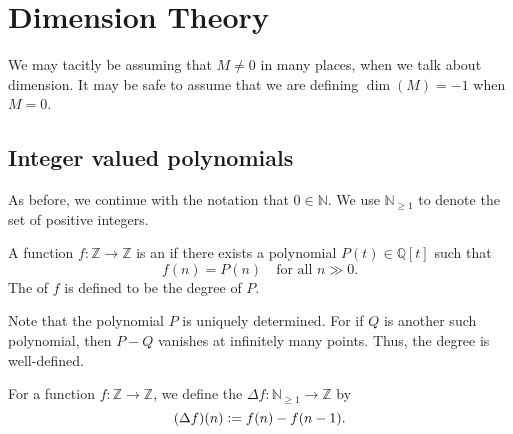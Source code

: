 \documentclass[12pt]{article}
\begin{document}
\section{Dimension Theory}

We may tacitly be assuming that $M \neq 0$ in many places, when we talk about dimension. It may be safe to assume that we are defining $\dim(M) = -1$ when $M = 0$.

\subsection{Integer valued polynomials}

As before, we continue with the notation that $0 \in \mathbb{N}$. We use $\mathbb{N}_{\ge 1}$ to denote the set of positive integers.

\begin{defn}
	A function $f : \mathbb{Z} \to \mathbb{Z}$ is an  if there exists a polynomial $P(t) \in \mathbb{Q}[t]$ such that 
	\begin{equation*} 
		f(n) = P(n) \quad \text{for all $n \gg 0$}.
	\end{equation*}
	The  of $f$ is defined to be the degree of $P$.
\end{defn}
Note that the polynomial $P$ is uniquely determined. For if $Q$ is another such polynomial, then $P - Q$ vanishes at infinitely many points. Thus, the degree is well-defined.

\begin{defn}
	For a function $f : \mathbb{Z} \to \mathbb{Z}$, we define the  $\Delta f : \mathbb{N}_{\ge 1} \to \mathbb{Z}$ by
	\begin{equation*} 
		(\Delta f)(n) \vcentcolon= f(n) - f(n - 1).
	\end{equation*}
\end{defn}
\end{document}
